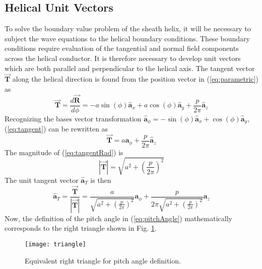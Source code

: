 \subsection{Helical Unit Vectors}
To solve the boundary value problem of the sheath helix, it will be necessary to subject the wave equations to the helical boundary conditions. These boundary conditions require evaluation of the tangential and normal field components across the helical conductor. It is therefore necessary to develop unit vectors which are both parallel and perpendicular to the helical axis. The tangent vector $\vec{\mathbf{T}}$ along the helical direction is found from the position vector in (\ref{eq:parametric}) as
\begin{equation}\label{eq:tangent}
	\vec{\mathbf{T}} = \frac{d\vec{\mathbf{R}}}{d\phi} = -a\sin(\phi)\hat{\mathbf{a}}_{x} + a\cos(\phi)\hat{\mathbf{a}}_{y} + \frac{p}{2\pi}\hat{\mathbf{a}}_{z}
\end{equation}
Recognizing the bases vector transformation $\hat{\mathbf{a}}_{\phi} = -\sin(\phi)\hat{\mathbf{a}}_{x}+\cos(\phi)\hat{\mathbf{a}}_{y}$, (\ref{eq:tangent}) can be rewritten as
\begin{equation}\label{eq:tangentRad}
	\vec{\mathbf{T}} = a{\mathbf{a}}_{\phi} + \frac{p}{2\pi}\hat{\mathbf{a}}_{z}
\end{equation}
The magnitude of (\ref{eq:tangentRad}) is 
\begin{equation}\label{eq:tangentMag}
	|\vec{\mathbf{T}}| = \sqrt{a^2 + \left(\frac{p}{2\pi}\right)^2}
\end{equation}
The unit tangent vector $\hat{\mathbf{a}}_{T}$ is then
\begin{equation}\label{eq:tangentUnit}
	\hat{\mathbf{a}}_{T} = \frac{\vec{\mathbf{T}}}{|\vec{\mathbf{T}}|} 
	= \frac{a}{\sqrt{a^2 + \left(\frac{p}{2\pi}\right)^2}} \mathbf{a}_{\phi} 
	+ \frac{p}{2\pi\sqrt{a^2 + \left(\frac{p}{2\pi}\right)^2}} \mathbf{a}_{z}
\end{equation}
Now, the definition of the pitch angle in (\ref{eq:pitchAngle}) mathematically corresponds to the right triangle shown in Fig. \ref{fig:triangle}.
\begin{figure}[h]
	\centering
	\texttt{[image: triangle]}
	\caption{Equivalent right triangle for pitch angle definition.}
	\label{fig:triangle}
\end{figure}

